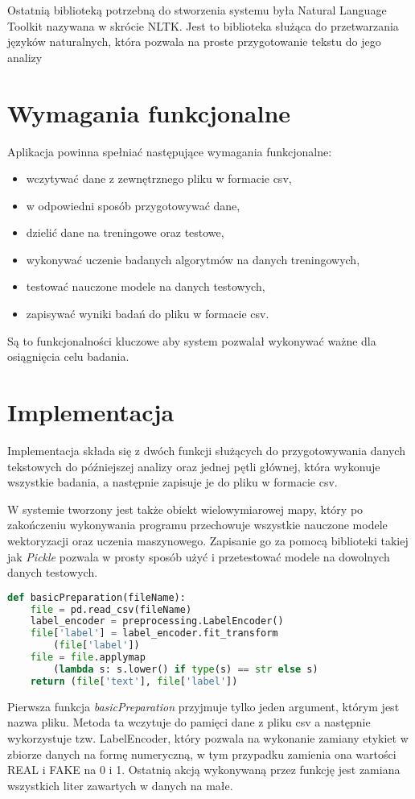 Ostatnią biblioteką potrzebną do stworzenia systemu była Natural Language Toolkit nazywana w skrócie 
NLTK. Jest to biblioteka służąca do przetwarzania języków naturalnych, która pozwala na proste przygotowanie tekstu do jego analizy
\section{Wymagania funkcjonalne}
Aplikacja powinna spełniać następujące wymagania funkcjonalne: 
\begin{itemize}
    \item wczytywać dane z zewnętrznego pliku w formacie csv,
    \item w odpowiedni sposób przygotowywać dane,
    \item dzielić dane na treningowe oraz testowe,
    \item wykonywać uczenie badanych algorytmów na danych treningowych,
    \item testować nauczone modele na danych testowych,
    \item zapisywać wyniki badań do pliku w formacie csv.
\end{itemize}
Są to funkcjonalności kluczowe aby system pozwalał wykonywać ważne dla osiągnięcia celu
badania. 
\section{Implementacja}
Implementacja składa się z dwóch funkcji służących do przygotowywania danych tekstowych
do późniejszej analizy oraz jednej pętli głównej, która wykonuje wszystkie badania,
a następnie zapisuje je do pliku w formacie csv. 

W systemie tworzony jest także obiekt
wielowymiarowej mapy, który po zakończeniu wykonywania programu przechowuje
wszystkie nauczone modele wektoryzacji oraz uczenia maszynowego. Zapisanie go za pomocą
biblioteki takiej jak \textit{Pickle} pozwala
w prosty sposób użyć i przetestować modele na dowolnych danych testowych. 


\begin{lstlisting}[language=Python, caption={Funkcja przygotowywująca dane pobrane z pliku csv}, captionpos=b, frame=single]
def basicPreparation(fileName): 
    file = pd.read_csv(fileName)
    label_encoder = preprocessing.LabelEncoder()
    file['label'] = label_encoder.fit_transform
        (file['label']) 
    file = file.applymap
        (lambda s: s.lower() if type(s) == str else s) 
    return (file['text'], file['label'])
\end{lstlisting}
Pierwsza funkcja \textit{basicPreparation} przyjmuje tylko jeden argument, którym jest
nazwa pliku. Metoda ta wczytuje do pamięci dane z pliku csv a następnie wykorzystuje
tzw. LabelEncoder, który pozwala na wykonanie zamiany etykiet w zbiorze danych na formę
numeryczną, w tym przypadku zamienia ona wartości REAL i FAKE na 0 i 1. Ostatnią 
akcją wykonywaną przez funkcję jest zamiana wszystkich liter zawartych w danych na małe.

